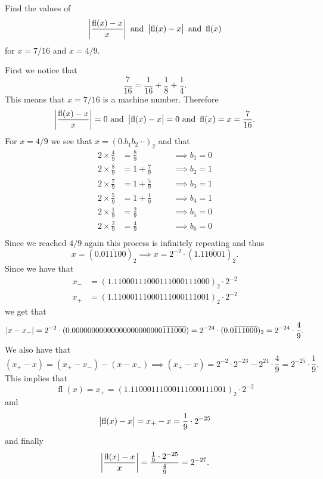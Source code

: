\documentclass[11pt, a4paper]{article}
\DeclareMathOperator{\fl}{fl}
\begin{document}
\begin{exercise}
  Find the values of
  \[
    \abs{\frac{\fl(x) - x}{x}} \stand \abs{\fl(x) - x} \stand \fl(x)
  \]
  for $x = 7 / 16$ and $x = 4 / 9$.
\end{exercise}
\begin{solution}
  First we notice that
  \[
    \frac{7}{16} = \frac{1}{16} + \frac{1}{8} + \frac{1}{4}.
  \]
  This means that $x = 7 / 16$ is a machine number.
  Therefore
  \[
    \abs{\frac{\fl(x) - x}{x}} = 0 \stand
    \abs{\fl(x) - x} = 0
    \stand \fl(x) = x = \frac{7}{16}.
  \]
  For $x = 4 / 9$ we see that
  $x = (0.b_1 b_2 \cdots)_{2}$
  and that
  \[ 
    \begin{aligned}
      2 \times \frac{4}{9} &= \frac{8}{9} \quad &&\implies b_1 = 0 \\
      2 \times \frac{8}{9} &= 1 + \frac{7}{9} \quad &&\implies b_2 = 1 \\
      2 \times \frac{7}{9} &= 1 + \frac{5}{9} \quad &&\implies b_3 = 1 \\
      2 \times \frac{5}{9} &= 1 + \frac{1}{9} \quad &&\implies b_4 = 1 \\
      2 \times \frac{1}{9} &= \frac{2}{9} \quad &&\implies b_5 = 0 \\
      2 \times \frac{2}{9} &= \frac{4}{9} \quad &&\implies b_6 = 0 \\
    \end{aligned}
  \]
  Since we reached $4 / 9$ again this process is infinitely repeating and
  thus
  \[
    x = (0.\overline{011100})_{2} \implies
    x = 2^{-2} \cdot (1.\overline{110001})_{2}.
  \]
  Since we have that
  \begin{align*}
    x_- &= (1.11000111000111000111000)_{2} \cdot 2^{-2} \\
    x_+ &= (1.11000111000111000111001)_{2} \cdot 2^{-2}
  \end{align*}
  we get that
  \[
    \left\lvert x - x_-\right\rvert =
    2^{-2} \cdot (0.00000000000000000000000\overline{111000}) =
    2^{-24} \cdot (0.0\overline{111000})_2 =
    2^{-24} \cdot \frac{4}{9}.
  \]
  We also have that
  \[
    (x_+ - x) =
    (x_+ - x_-) - (x - x_-)
    \implies
    (x_+ - x) =
    2^{-2} \cdot 2^{-23} - 2^{24} \cdot \frac{4}{9} =
    2^{-25} \cdot \frac{1}{9}.
  \]
  This implies that
  \[
    \fl(x) = x_+ =
    (1.11000111000111000111001)_{2} \cdot 2^{-2}
  \]
  and
  \[
    \abs{\fl(x) - x} =
    x_+ - x =
    \frac{1}{9} \cdot 2^{-25}
  \]
  and finally
  \[
    \abs{\frac{\fl(x) - x}{x}} =
    \frac{\frac{1}{9} \cdot 2^{-25}}{\frac{4}{9}} =
    2^{-27}.
  \]
\end{solution}
\end{document}
